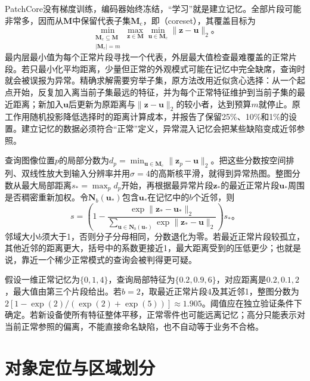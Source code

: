 PatchCore没有梯度训练，编码器始终冻结，“学习”就是建立记忆。全部片段可能非常多，因而从$\bm{M}$中保留代表子集$\bm{M}_{\mathrm{c}}$，即（coreset），其覆盖目标为
\begin{equation}
 \min_{\substack{\bm{M}_{\mathrm{c}}\subseteq\bm{M}\\
 |\bm{M}_{\mathrm{c}}|=m}}
 \max_{\bm{z}\in\bm{M}}\min_{\bm{u}\in\bm{M}_{\mathrm{c}}}
 \lVert\bm{z}-\bm{u}\rVert_2\text{。}
 \label{eq:vision-patchcore-coreset}
\end{equation}
最内层最小值为每个正常片段寻找一个代表，外层最大值检查最难覆盖的正常片段。若只最小化平均距离，少量但正常的外观模式可能在记忆中完全缺席，查询时就会被误报为异常。精确求解需要穷举子集，原方法改用近似贪心选择：从一个起点开始，反复加入离当前子集最远的特征，并为每个正常特征维护到当前子集的最近距离；新加入$\bm{u}$后更新为原距离与$\lVert\bm{z}-\bm{u}\rVert_2$的较小者，达到预算$m$就停止。原工作用随机投影降低选择时的距离计算成本，并报告了保留25\%、10\%和1\%的设置。建立记忆的数据必须符合“正常”定义，异常混入记忆会把某些缺陷变成近邻参照。

查询图像位置$p$的局部分数为$d_p=\min_{\bm{u}\in\bm{M}_{\mathrm{c}}}\lVert\bm{z}_p-\bm{u}\rVert_2$。把这些分数按空间排列、双线性放大到输入分辨率并用$\sigma=4$的高斯核平滑，就得到异常热图。整图分数从最大局部距离$s_*=\max_p d_p$开始，再根据最异常片段$\bm{z}_*$的最近正常片段$\bm{u}_*$周围是否稠密重新加权。令$\bm{N}_b(\bm{u}_*)$包含$\bm{u}_*$在记忆中的$b$个近邻，则
\begin{equation}
 s=\left(1-
 \frac{\exp\lVert\bm{z}_*-\bm{u}_*\rVert_2}
 {\sum_{\bm{u}\in\bm{N}_b(\bm{u}_*)}
  \exp\lVert\bm{z}_*-\bm{u}\rVert_2}\right)s_*\text{。}
 \label{eq:vision-patchcore-score}
\end{equation}
邻域大小$b$须大于1，否则分子分母相同，分数退化为零。若最近正常片段较孤立，其他近邻的距离更大，括号中的系数更接近1，最大距离受到的压低更少；也就是说，靠近一个稀少正常模式的查询会被判得更可疑。

假设一维正常记忆为$\{0,1,4\}$，查询局部特征为$\{0.2,0.9,6\}$，对应距离是$0.2,0.1,2$，最大值由第三个片段给出。若$b=2$，取最近正常片段4及其近邻1，整图分数为$2[1-\exp(2)/(\exp(2)+\exp(5))]\approx1.905$。阈值应在独立验证条件下确定。若新设备使所有特征整体平移，正常零件也可能远离记忆；高分只能表示对当前正常参照的偏离，不能直接命名缺陷，也不自动等于业务不合格。

\section{对象定位与区域划分}
\label{sec:vision-recognition-regions}

